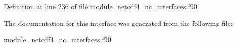 Definition at line 236 of file module\+\_\+netcdf4\+\_\+nc\+\_\+interfaces.\+f90.



The documentation for this interface was generated from the following file\+:\begin{DoxyCompactItemize}
\item 
\hyperlink{module__netcdf4__nc__interfaces_8f90}{module\+\_\+netcdf4\+\_\+nc\+\_\+interfaces.\+f90}\end{DoxyCompactItemize}
